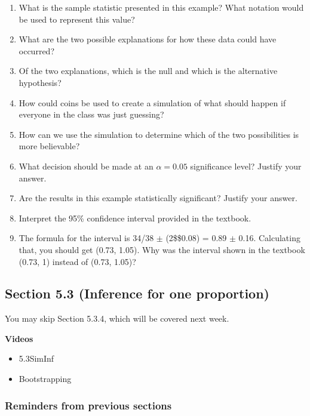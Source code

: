 \documentclass[
]{report}
\providecommand{\tightlist}{%
  \setlength{\itemsep}{0pt}\setlength{\parskip}{0pt}}
\newcommand{\rgs}{\vspace{12pt}} %
\begin{document}
\begin{enumerate}
\def\labelenumi{\arabic{enumi}.}
\item
  What is the sample statistic presented in this example? What notation would be used to represent this value?
  \rgs
\item
  What are the two possible explanations for how these data could have occurred?
  \rgs
  \rgs
\item
  Of the two explanations, which is the null and which is the alternative hypothesis?
  \rgs
\item
  How could coins be used to create a simulation of what should happen if everyone in the class was just guessing?
  \rgs
  \rgs
  \rgs
\item
  How can we use the simulation to determine which of the two possibilities is more believable?
  \rgs
  \rgs
\item
  What decision should be made at an \(\alpha = 0.05\) significance level? Justify your answer.
  \rgs
\item
  Are the results in this example statistically significant? Justify your answer.
  \rgs
\item
  Interpret the 95\% confidence interval provided in the textbook.
  \rgs
  \rgs
\item
  The formula for the interval is 34/38 \(\pm\) (2\$\times\$0.08) = 0.89 \(\pm\) 0.16. Calculating that, you should get (0.73, 1.05). Why was the interval shown in the textbook (0.73, 1) instead of (0.73, 1.05)?
  \rgs
\end{enumerate}

\hypertarget{section-5.3-inference-for-one-proportion}{%
\subsection*{Section 5.3 (Inference for one proportion)}\label{section-5.3-inference-for-one-proportion}}


You may skip Section 5.3.4, which will be covered next week.

\textbf{Videos}

\begin{itemize}
\tightlist
\item
  5.3SimInf
\item
  Bootstrapping
\end{itemize}

\hypertarget{reminders-from-previous-sections}{%
\subsubsection*{Reminders from previous sections}\label{reminders-from-previous-sections}}
\end{document}
